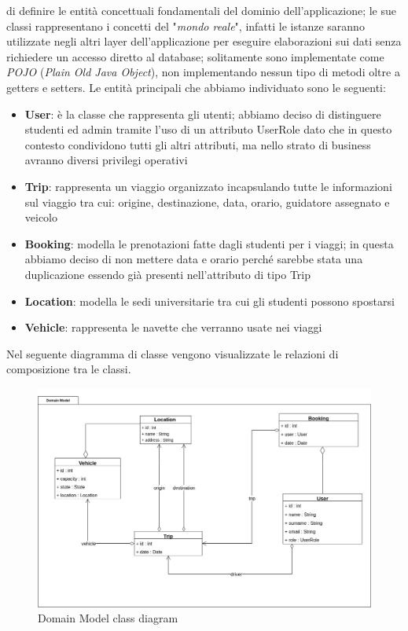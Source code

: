  di definire le entità concettuali fondamentali del dominio dell'applicazione; le sue classi rappresentano i concetti del "\textit{mondo reale}", infatti le istanze saranno utilizzate negli altri layer dell'applicazione per eseguire elaborazioni sui dati senza richiedere un accesso diretto al database; solitamente sono implementate come \textit{POJO} (\textit{Plain Old Java Object}), non implementando nessun tipo di metodi oltre a getters e setters.
Le entità principali che abbiamo individuato sono le seguenti:
\begin{itemize}
    \item \textbf{User}: è la classe che rappresenta gli utenti; abbiamo deciso di distinguere studenti ed admin tramite l'uso di un attributo UserRole dato che in questo contesto condividono  tutti gli altri attributi, ma nello strato di business avranno diversi privilegi operativi
    \item \textbf{Trip}: rappresenta un viaggio organizzato incapsulando tutte le informazioni sul viaggio tra cui: origine, destinazione, data, orario, guidatore assegnato e veicolo
    \item \textbf{Booking}: modella le prenotazioni fatte dagli studenti per i viaggi; in questa abbiamo deciso di non mettere data e orario perché sarebbe stata una duplicazione essendo già presenti nell'attributo di tipo Trip
    \item \textbf{Location}: modella le sedi universitarie tra cui gli studenti possono spostarsi
    \item \textbf{Vehicle}: rappresenta le navette che verranno usate nei viaggi
\end{itemize}
Nel seguente diagramma di classe vengono visualizzate le relazioni di composizione tra le classi.
\begin{figure}[H]
    \centering
    \includegraphics[width=1\linewidth]{Images/DomainModel_diag.png}
    \caption{Domain Model class diagram}
    \label{fig:DMdiag}
\end{figure}
